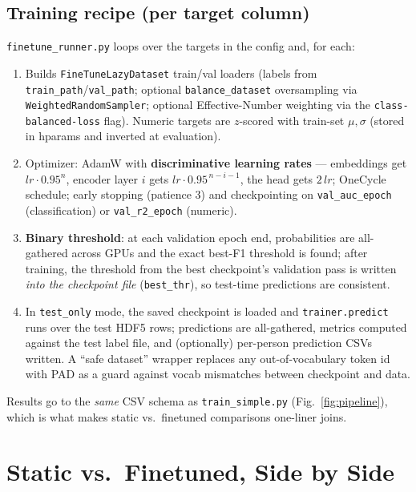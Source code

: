 \documentclass[11pt,a4paper]{article}
\newcommand{\file}[1]{\texttt{\small #1}}
\newcommand{\code}[1]{\texttt{\small #1}}
\begin{document}
\subsection{Training recipe (per target column)}
\code{finetune\_runner.py} loops over the targets in the config and, for each:
\begin{enumerate}[nosep]
  \item Builds \code{FineTuneLazyDataset} train/val loaders (labels from
        \code{train\_path}/\code{val\_path}; optional
        \code{balance\_dataset} oversampling via \code{WeightedRandomSampler};
        optional Effective-Number weighting via the
        \code{class-balanced-loss} flag). Numeric targets
        are $z$-scored with train-set $\mu,\sigma$ (stored in hparams and
        inverted at evaluation).
  \item Optimizer: AdamW with \textbf{discriminative learning rates} ---
        embeddings get $lr \cdot 0.95^{n}$, encoder layer $i$ gets
        $lr \cdot 0.95^{\,n-i-1}$, the head gets $2\,lr$; OneCycle schedule;
        early stopping (patience 3) and checkpointing on \code{val\_auc\_epoch}
        (classification) or \code{val\_r2\_epoch} (numeric).
  \item \textbf{Binary threshold}: at each validation epoch end, probabilities
        are all-gathered across GPUs and the exact best-F1 threshold is found;
        after training, the threshold from the best checkpoint's validation
        pass is written \emph{into the checkpoint file} (\code{best\_thr}), so
        test-time predictions are consistent.
  \item In \code{test\_only} mode, the saved checkpoint is loaded and
        \code{trainer.predict} runs over the test HDF5 rows; predictions are
        all-gathered, metrics computed against the test label file, and
        (optionally) per-person prediction CSVs written. A ``safe dataset''
        wrapper replaces any out-of-vocabulary token id with PAD as a guard
        against vocab mismatches between checkpoint and data.
\end{enumerate}
Results go to the \emph{same} CSV schema as \file{train\_simple.py}
(Fig.~\ref{fig:pipeline}), which is what makes static vs.\ finetuned comparisons
one-liner joins.

\section{Static vs.\ Finetuned, Side by Side}
\end{document}
